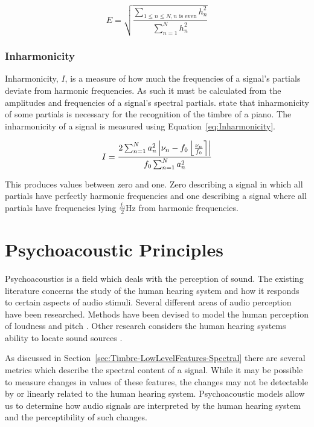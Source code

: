 			\begin{equation}
				E = \sqrt{\frac{\sum_{1 \leq n \leq N, n \text{ is even}} h_{n}^{2}}
					       {\sum_{n = 1}^{N} h_{n}^{2}}}
				\label{eq:Evenness}
			\end{equation}

		\subsubsection*{Inharmonicity}
			Inharmonicity, $I$, is a measure of how much the frequencies of a signal's partials deviate from
			harmonic frequencies. As such it must be calculated from the amplitudes and frequencies of a
			signal's spectral partials. \citet{fletcher1962quality} state that inharmonicity of some partials
			is necessary for the recognition of the timbre of a piano. The inharmonicity of a signal is
			measured using Equation~\ref{eq:Inharmonicity}.
			
			\begin{equation}
				I = \frac{2\sum_{n = 1}^{N}a_{n}^{2}
					   \left|\nu_{n} - f_{0}\left\lfloor\frac{\nu_{n}}{f_{0}}\right\rceil\right|}
					   {f_{0}\sum_{n = 1}^{N} a_{n}^{2}}
				\label{eq:Inharmonicity}
			\end{equation}

			This produces values between zero and one. Zero describing a signal in which all partials have
			perfectly harmonic frequencies and one describing a signal where all partials have frequencies
			lying $\frac{f_{0}}{2}$Hz from harmonic frequencies.

\section{Psychoacoustic Principles}
\label{sec:Timbre-PsychoacousticPrinciples}
	Psychoacoustics is a field which deals with the perception of sound. The existing literature concerns the study of
	the human hearing system and how it responds to certain aspects of audio stimuli. Several different areas of audio
	perception have been researched. Methods have been devised to model the human perception of loudness
	\citep{moore1997a} and pitch \citep{gerhard2003pitch}. Other research considers the human hearing systems ability
	to locate sound sources \citep{blauert1997spatial}. 

	As discussed in Section~\ref{sec:Timbre-LowLevelFeatures-Spectral} there are several metrics which describe the
	spectral content of a signal. While it may be possible to measure changes in values of these features, the changes
	may not be detectable by or linearly related to the human hearing system. Psychoacoustic models allow us to
	determine how audio signals are interpreted by the human hearing system and the perceptibility of such changes.

